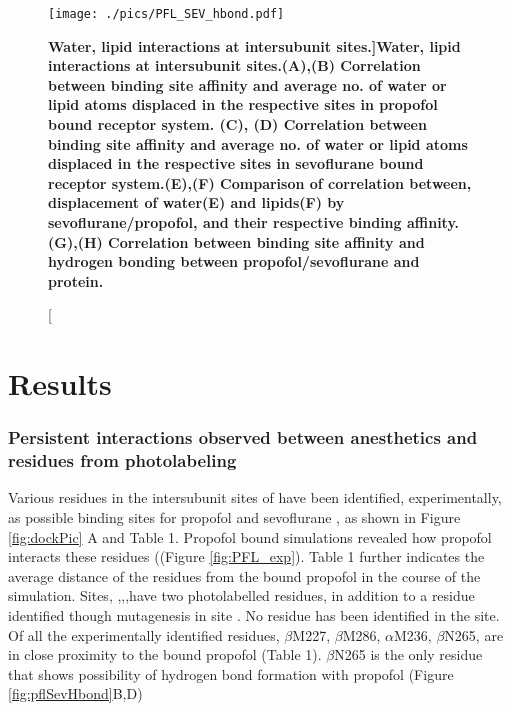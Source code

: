 \documentclass{biophys}
\begin{document}
\begin{figure}
\begin{center}
\centering
\texttt{[image: ./pics/PFL\_SEV\_hbond.pdf]}
\caption[\bf Water, lipid interactions at intersubunit sites.]{{\bf Water, lipid interactions at intersubunit sites.}(A),(B) Correlation between binding site affinity and average no. of water or lipid atoms displaced in the respective sites in propofol bound receptor system. (C), (D) Correlation between binding site affinity and average no. of water or lipid atoms displaced in the respective sites in sevoflurane bound receptor system.(E),(F) Comparison of correlation between, displacement of water(E) and lipids(F) by sevoflurane/propofol, and their respective binding affinity.(G),(H)  Correlation between binding site affinity and hydrogen bonding between propofol/sevoflurane and protein. }
\label{fig:PFL_int}
\end{center}
\end{figure}




\section{Results}
\subsubsection{Persistent interactions observed between anesthetics and residues from photolabeling}

Various residues in the intersubunit sites of \GABAA  have been identified, experimentally, as possible binding sites for propofol \cite{Jayakar2014}and sevoflurane \cite{Woll2018a}, as shown in Figure \ref{fig:dockPic} A and Table 1. Propofol bound \GABAA simulations revealed how propofol interacts these residues ((Figure \ref{fig:PFL_exp}). Table 1 further indicates the average distance of the residues from the bound propofol in the course of the simulation. Sites, \gb,\gba,\ab,\bag have two photolabelled residues, in addition to a residue identified though mutagenesis in site \bag. No residue has been identified in the \ag site.
Of all the experimentally identified residues,  $\beta$M227, $\beta$M286, $\alpha$M236,  $\beta$N265, are in close proximity to the bound propofol (Table 1). $\beta$N265 is the only residue that shows possibility of hydrogen bond formation with propofol (Figure \ref{fig:pflSevHbond}B,D)
\end{document}
